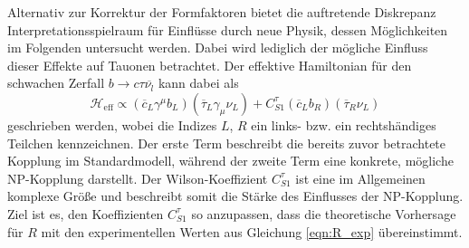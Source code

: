 Alternativ zur Korrektur der Formfaktoren bietet die auftretende Diskrepanz Interpretationsspielraum für Einflüsse durch neue Physik, dessen Möglichkeiten im Folgenden untersucht werden.
Dabei wird lediglich der mögliche Einfluss dieser Effekte auf Tauonen betrachtet.
Der effektive Hamiltonian für den schwachen Zerfall $b \to c \tau \overline{\nu_l}$ kann dabei als
\begin{equation}
  \mathcal{H}_\text{eff} \propto (\overline{c}_L \gamma^\mu b_L)(\overline{\tau}_L \gamma_\mu \nu_L ) +  C_{S1}^\tau (\overline {c}_L b_R) (\overline{\tau}_R \nu_L)
\end{equation}
geschrieben werden, wobei die Indizes $L$, $R$ ein links- bzw. ein rechtshändiges Teilchen kennzeichnen.
Der erste Term beschreibt die bereits zuvor betrachtete Kopplung  im Standardmodell, während der zweite Term eine konkrete, mögliche NP-Kopplung  darstellt.
Der Wilson-Koeffizient $C_{S1}^\tau$ ist eine im Allgemeinen komplexe Größe und beschreibt somit die Stärke des Einflusses der NP-Kopplung.
Ziel ist es, den Koeffizienten $C_{S1}^\tau$ so anzupassen, dass die theoretische Vorhersage für $R$ mit den experimentellen Werten aus Gleichung \eqref{eqn:R_exp} übereinstimmt.

